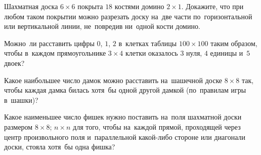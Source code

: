 \begin{problems}
\item
Шахматная доска $6 \times 6$ покрыта $18$ костями домино $2 \times 1$.
Докажите, что при любом таком покрытии можно разрезать доску на~две части
по~горизонтальной или вертикальной линии, не~повредив ни~одной кости домино.

\item
Можно~ли расставить цифры $0$, $1$, $2$ в~клетках таблицы $100 \times 100$
таким образом, чтобы в~каждом прямоугольнике $3 \times 4$ клетки оказалось
$3$ нуля, $4$ единицы и~$5$ двоек?

\item
Какое наибольшее число дамок можно расставить на~шашечной доске $8 \times 8$
так, чтобы каждая дамка билась хотя~бы одной другой дамкой
(по~правилам игры в~шашки)?

\item
Какое наименьшее число фишек нужно поставить на~поля шахматной доски размером
\quad
\sp $8 \times 8$;
\quad
\sp $n \times n$
\quad
для того, чтобы на~каждой прямой, проходящей через центр произвольного поля
и~параллельной какой-либо стороне или диагонали доски, стояла хотя~бы одна
фишка?

\end{problems}

